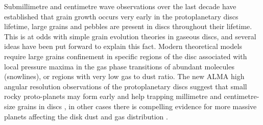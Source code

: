 \documentclass[10pt,fleqn,twoside]{article}
\begin{document}
Submillimetre and centimetre wave observations over the last decade have established that grain growth occurs very early in the protoplanetary discs lifetime, large grains and pebbles are present in discs throughout their lifetime. This is at odds with simple grain evolution theories in gaseous discs, and several ideas have been put forward to explain this fact. Modern theoretical models require large grains confinement in specific regions of the disc associated with local pressure maxima in the gas phase transitions of abundant molecules (snowlines), or regions with very low gas to dust ratio. The new ALMA high angular resolution observations of the protoplanetary discs suggest that small rocky proto-planets may form early and help trapping millimetre and centimetre-size grains in discs \citep[HL~Tau,][]{2015ApJ...808L...3A}, in other cases there is compelling evidence for more massive planets affecting the disk dust and gas distribution \citep{Isella2016,2016Sci...353.1519P}.  
\end{document}
